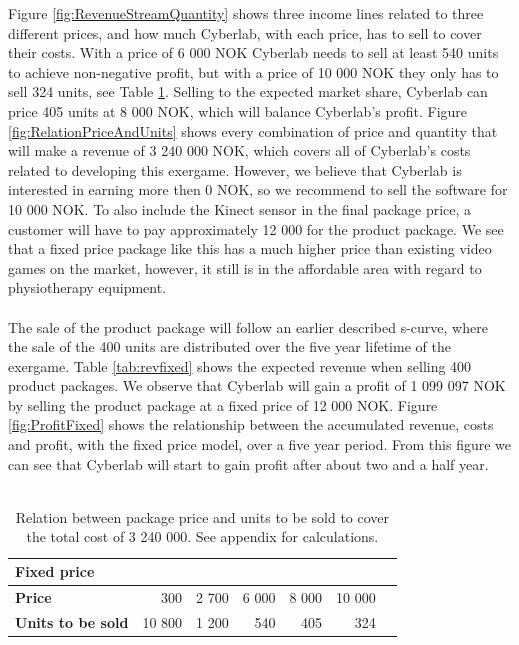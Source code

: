 Figure \ref{fig:RevenueStreamQuantity} shows three income lines related to three different prices, and how much Cyberlab, with each price, has to sell to cover their costs. With a price of 6 000 NOK Cyberlab needs to sell at least 540 units to achieve non-negative profit, but with a price of 10 000 NOK they only has to sell 324 units, see Table \ref{tab:unitsfixed}. Selling to the expected market share, Cyberlab can price 405 units at 8 000 NOK, which will balance Cyberlab's profit. Figure \ref{fig:RelationPriceAndUnits} shows every combination of price and quantity that will make a revenue of 3 240 000 NOK, which covers all of Cyberlab's costs related to developing this exergame. However, we believe that Cyberlab is interested in earning more then 0 NOK, so we recommend to sell the software for 10 000 NOK. To also include the Kinect sensor in the final package price, a customer will have to pay approximately 12 000 for the product package. We see that a fixed price package like this has a much higher price than existing video games on the market, however, it still is in the affordable area with regard to physiotherapy equipment. \\ \\
The sale of the product package will follow an earlier described s-curve, where the sale of the 400 units are distributed over the five year lifetime of the exergame. Table \ref{tab:revfixed} shows the expected revenue when selling 400 product packages. We observe that Cyberlab will gain a profit of 1 099 097 NOK by selling the product package at a fixed price of 12 000 NOK. Figure \ref{fig:ProfitFixed} shows the relationship between the accumulated revenue, costs and profit, with the fixed price model, over a five year period. From this figure we can see that Cyberlab will start to gain profit after about two and a half year. \\ \\
\begin{table}
\centering
    \begin{tabular}{|l|r|r|r|r|r|r|}
        \hline
       \textbf{Fixed price}  & & & & & \\ \hline
      \textbf{Price} & 300 & 2 700 & 6 000 & 8 000 & 10 000 \\ \hline
	   \textbf{Units to be sold} & 10 800 & 1 200 & 540 & 405 & 324 \\ \hline	
    \end{tabular}
    \caption[Price and Unit examples with the fixed price model]{Relation between package price and units to be sold to cover the total cost of 3 240 000. See appendix for calculations.}
    \label{tab:unitsfixed}
\end{table}

